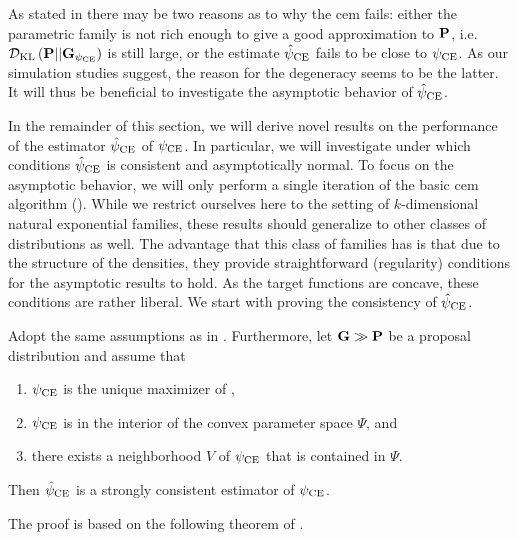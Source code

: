 As stated in \citep{Chan2012Improved} there may be two reasons as to why the \acrshort{cem} fails: either the parametric family is not rich enough to give a good approximation to $\P$, i.e. $ \Dkl{\P}{\G_{\pce}}$ is still large, or the estimate $\hpce$ fails to be close to $\pce$. As our simulation studies  suggest, the reason for the degeneracy seems to be the latter. It will thus be beneficial to investigate the asymptotic behavior of $\hpce$. 

In the remainder of this section, we will derive novel results on the performance of the estimator $\hpce$ of $\pce$. In particular, we will investigate under which conditions $\hpce$ is consistent and asymptotically normal. To focus on the asymptotic behavior, we will only perform a single iteration of the basic \acrshort{cem} algorithm (). While we restrict ourselves here to the setting of $k$-dimensional natural exponential families, these results should generalize to other classes of distributions as well. The advantage that this class of families has is that due to the structure of the densities, they provide straightforward (regularity) conditions for the asymptotic results to hold. As the target functions are concave, these conditions are rather liberal. We start with proving the consistency of $\hpce$. 

\begin{proposition}
    \label{prop:cem-consistent}
    Adopt the same assumptions as in . Furthermore, let $\G \gg \P$ be a proposal distribution and assume that
    
    \begin{enumerate}
        \item $\pce$ is the unique maximizer of ,
        \item $\pce$ is in the interior of the convex parameter space $\Psi$, and
        \item there exists a neighborhood $V$ of $\pce$ that is contained in $\Psi$.
    \end{enumerate}
    
   Then $\hpce$ is a strongly consistent estimator of $\pce$.
\end{proposition}

The proof is based on the following theorem of \citeauthor{Haberman1989Concavity}.

